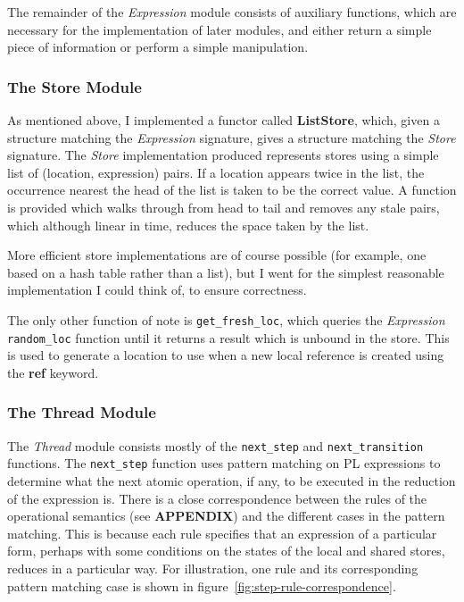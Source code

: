 \documentclass[12pt,a4paper,twoside,openright]{report}
\begin{document}
The remainder of the \emph{Expression} module
consists of auxiliary functions, which are
necessary for the implementation of later
modules, and either return a simple piece
of information or perform a simple manipulation.

\subsubsection{The Store Module}
As mentioned above, I implemented a functor
called \textbf{ListStore}, which, given a structure
matching the \emph{Expression} signature,
gives a structure matching the \emph{Store}
signature. The \emph{Store} implementation produced
represents stores using a simple list of
(location, expression) pairs. If a location
appears twice in the list, the occurrence
nearest the head of the list is taken to be
the correct value. A function is provided
which walks through from head to tail and
removes any stale pairs, which although
linear in time, reduces the space taken
by the list.

More efficient store implementations are of
course possible (for example, one based on
a hash table rather than a list), but
I went for the simplest reasonable
implementation I could think of, to
ensure correctness.

The only other function of note is
\texttt{get\_fresh\_loc},
which queries the \emph{Expression} \texttt{random\_loc}
function until it returns a result which is
unbound in the store. This is used to generate a location
to use when a new local reference is created using the
\textbf{ref} keyword.

\subsubsection{The Thread Module}
The \emph{Thread} module consists mostly of
the \texttt{next\_step} and \texttt{next\_transition}
functions. The \texttt{next\_step} function uses pattern
matching on PL expressions to determine what the next atomic
operation, if any, to be executed in the reduction
of the expression is. There is a close correspondence
between the
rules of the operational semantics (see \textbf{APPENDIX})
and the different cases in the pattern matching. This is
because each rule specifies that an expression of a
particular form, perhaps with some conditions on the
states of the local and shared stores, reduces in a
particular way. For illustration, one rule and its
corresponding pattern matching case is shown in 
figure~\ref{fig:step-rule-correspondence}.
\end{document}
